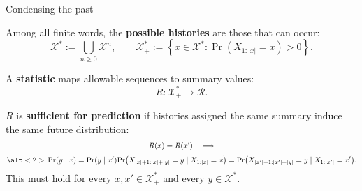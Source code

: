 \documentclass[aspectratio=169,12pt,t]{beamer}
\begin{document}
\begin{frame}{Condensing the past}
  \setlength{\parskip}{0pt}
  \setlength{\abovedisplayskip}{4pt}
  \setlength{\belowdisplayskip}{4pt}

  Among all finite words, the \textbf{possible histories} are those that can occur:
  \[
    \mathcal X^* := \textstyle\bigcup_{n\ge 0}\mathcal X^n,
    \qquad
    \mathcal X_+^*
      :=\left\{x\in\mathcal X^* \mathrel{:} \Pr(X_{1:|x|}=x)>0\right\}.
  \]

  \vspace{3mm}
  A \textbf{statistic} maps allowable sequences to summary values:
  \[
    R:\mathcal X_+^*\to\mathcal R.
  \]

  \vspace{3mm}
  $R$ is \textbf{sufficient for prediction} if histories assigned the same
  summary induce the same future distribution:
  \def\fullpredictionequality{%
    \Pr\!\left(X_{|x|+1:|x|+|y|}=y\mid X_{1:|x|}=x\right)
    =\Pr\!\left(X_{|x'|+1:|x'|+|y|}=y\mid X_{1:|x'|}=x'\right)}
  \[
    \begin{gathered}
      R(x)=R(x')\quad\Longrightarrow\\[1mm]
      \alt<2>{\vphantom{\fullpredictionequality}\Pr(y\mid x)=\Pr(y\mid x')}
        {\fullpredictionequality}.
    \end{gathered}
  \]
  \vspace{3mm}
  This must hold for every $x,x'\in\mathcal X_+^*$ and every
  $y\in\mathcal X^*$.

  \vfill

\end{frame}
\end{document}
